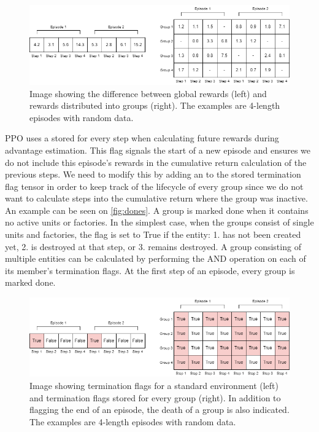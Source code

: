 \begin{figure}[htbp]
    \centering
    \includegraphics[width=0.8\linewidth]{images/methods_hybrid/trajectory_separation/rewards.png}
    \captionsetup{justification=justified, singlelinecheck=false, width=1\linewidth, labelfont=bf} 
    \caption[]{Image showing the difference between global rewards (left) and rewards distributed into groups (right). The examples are 4-length episodes with random data.}
    \label{fig:rewards}
\end{figure}

\bigskip

\noindent PPO uses a  stored for every step when calculating future rewards during advantage estimation. This flag signals the start of a new episode and ensures we do not include this episode's rewards in the cumulative return calculation of the previous steps. We need to modify this by adding an  to the stored termination flag tensor in order to keep track of the lifecycle of every group since we do not want to calculate steps into the cumulative return where the group was inactive. An example can be seen on \autoref{fig:dones}. A group is marked done when it contains no active units or factories. In the simplest case, when the groups consist of single units and factories, the flag is set to True if the entity: 1. has not been created yet, 2. is destroyed at that step, or 3. remains destroyed. A group consisting of multiple entities can be calculated by performing the AND operation on each of its member's termination flags. At the first step of an episode, every group is marked done.

\begin{figure}[htbp]
    \centering
    \includegraphics[width=0.8\linewidth]{images/methods_hybrid/trajectory_separation/dones.png}
    \captionsetup{justification=justified, singlelinecheck=false, width=1\linewidth, labelfont=bf} 
    \caption[]{Image showing termination flags for a standard environment (left) and termination flags stored for every group (right). In addition to flagging the end of an episode, the death of a group is also indicated. The examples are 4-length episodes with random data.}
    \label{fig:dones}
\end{figure}


